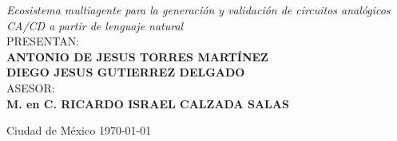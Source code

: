 \begin{titlepage}
    {\Large \textit{Ecosistema multiagente para la generación y validación de circuitos analógicos CA/CD a partir de lenguaje natural}}\\[1.5cm]
    
    \large PRESENTAN:\\[0.3cm]
    \textbf{ANTONIO DE JESUS TORRES MARTÍNEZ}\\[0.3cm]
     \textbf{DIEGO JESUS GUTIERREZ DELGADO}\\[1.5cm]
    
    \large ASESOR:\\[0.3cm]
    \textbf{M. en C. RICARDO ISRAEL CALZADA SALAS}\\[1.5cm]

    \vfill
    
    \normalsize Ciudad de México \today
    
\end{titlepage}